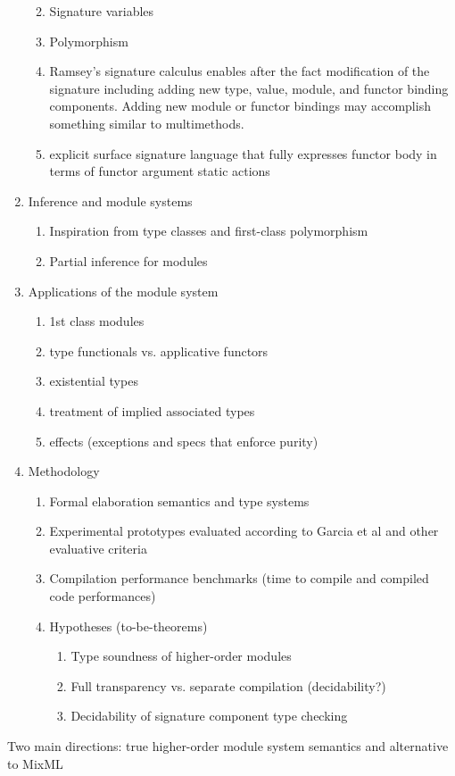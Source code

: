 \documentclass[12pt]{article}
\begin{document}
\begin{enumerate}
\begin{enumerate}
\begin{enumerate}
		\end{enumerate}		
		\item Signature variables \cite{jones96}
		\item Polymorphism
		\item Ramsey's signature calculus enables after the fact modification of the signature including adding new type, value, module, and functor binding components. Adding new module or functor bindings may accomplish something similar to multimethods. 
		\item explicit surface signature language that fully expresses functor body in terms of functor argument static actions
	\end{enumerate}
	\item Inference and module systems
	\begin{enumerate}
		\item Inspiration from type classes and first-class polymorphism
		\item Partial inference for modules
	\end{enumerate}
	\item Applications of the module system
	\begin{enumerate}
		\item 1st class modules
		\item type functionals vs. applicative functors
		\item existential types
		\item treatment of implied associated types 
		\item effects (exceptions and specs that enforce purity)
	\end{enumerate}
	\item Methodology
	\begin{enumerate}
		\item Formal elaboration semantics and type systems
		\item Experimental prototypes evaluated according to Garcia et al and other evaluative criteria
		\item Compilation performance benchmarks (time to compile and compiled code performances)
		\item Hypotheses (to-be-theorems)
		\begin{enumerate}
			\item Type soundness of higher-order modules
			\item Full transparency vs. separate compilation (decidability?)
			\item Decidability of signature component type checking
		\end{enumerate}
	\end{enumerate}
\end{enumerate}
Two main directions: true higher-order module system semantics and alternative to MixML

\end{document}
